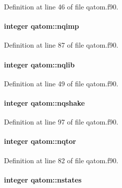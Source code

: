 Definition at line 46 of file qatom.\-f90.

\hypertarget{classqatom_af6bd0663972383ffa21ce1ee24b7ae78}{
\paragraph[{nqimp}]{\setlength{\rightskip}{0pt plus 5cm}integer qatom\-::nqimp}}\label{classqatom_af6bd0663972383ffa21ce1ee24b7ae78}


Definition at line 87 of file qatom.\-f90.

\hypertarget{classqatom_a89b0c646995581a2d8b5579f3f013795}{
\paragraph[{nqlib}]{\setlength{\rightskip}{0pt plus 5cm}integer qatom\-::nqlib}}\label{classqatom_a89b0c646995581a2d8b5579f3f013795}


Definition at line 49 of file qatom.\-f90.

\hypertarget{classqatom_a358d1217d3ef3822b8631ba69079912d}{
\paragraph[{nqshake}]{\setlength{\rightskip}{0pt plus 5cm}integer qatom\-::nqshake}}\label{classqatom_a358d1217d3ef3822b8631ba69079912d}


Definition at line 97 of file qatom.\-f90.

\hypertarget{classqatom_acaadc57dc029a20be016f75b558883e1}{
\paragraph[{nqtor}]{\setlength{\rightskip}{0pt plus 5cm}integer qatom\-::nqtor}}\label{classqatom_acaadc57dc029a20be016f75b558883e1}


Definition at line 82 of file qatom.\-f90.

\hypertarget{classqatom_ab24f0d8ce5d78bc90af82d3f9d155b3f}{
\paragraph[{nstates}]{\setlength{\rightskip}{0pt plus 5cm}integer qatom\-::nstates}}\label{classqatom_ab24f0d8ce5d78bc90af82d3f9d155b3f}


